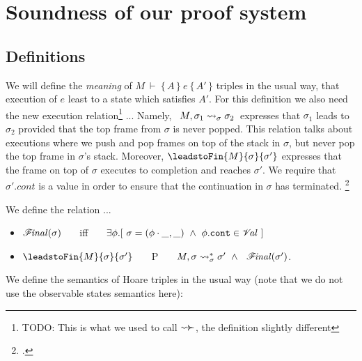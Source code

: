 


\section{Soundness of our proof system}

\subsection{Definitions}

We will define the {\emph {meaning}} of  $M\ \vdash\  \{\, A \,  \}\ e\  \{\, A' \, \}$ triples in the usual way, \ie that execution of $e$ least to a state which satisfies $A'$. For this definition we also need the new execution relation\footnote{TODO: This is what we used to call $\leadsto\!\!\succ$, the definition slightly different} ...
Namely, \ $M, \sigma_1 \leadsto_{\sigma} \sigma_2$\  expresses that $\sigma_1$ leads to $\sigma_2$ provided
 that the top frame from $\sigma$ is never popped. This relation talks about executions where we push and pop frames on top of the stack in $\sigma$, but never pop the top frame in $\sigma$'s stack. Moreover, $\leadstoFin {M} {\sigma} {\sigma'}$  expresses that the frame on top of $\sigma$ executes to completion and reaches $\sigma'$.
We require that $\sigma'.cont$ is a value in order to ensure that the continuation in $\sigma$ has terminated. \footnote{ .}
 
{
\begin{definition}
\label{def:term}
We define the relation  ...
\begin{itemize}
\item
${\mathcal F}\!\mathit{inal}(\sigma)$ \ \ \ iff \ \ \  $\exists \phi. [\ \sigma = (\phi\cdot\_,\_) \ \wedge \ \phi.\texttt{cont} \in {\mathcal V}\!\mathit{al} \ ]$
\item
$\leadstoFin {M} {\sigma} {\sigma'}$ \ \ \ P \ \ \  $\leadstoRecStar {M} {\sigma} {\sigma} {\sigma'} \ \wedge \ \ \Final{\sigma'}$.
\end{itemize}
\end{definition}
}

We define the semantics of Hoare triples in the usual way (note that we do not use the observable states semantics here): 

